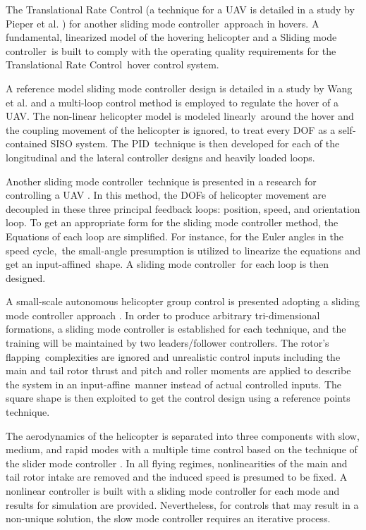 The Translational Rate Control (a technique for a UAV is detailed in a study by Pieper et al. \cite{pieper1995application}) for another sliding mode controller approach in hovers. A fundamental, linearized model of the hovering helicopter and a Sliding mode controller is built to comply with the operating quality requirements for the Translational Rate Control hover control system. 

A reference model sliding mode controller design is detailed in a study by Wang et al. \cite{wang2008model} and a multi-loop control method is employed to regulate the hover of a UAV. The non-linear helicopter model is modeled linearly around the hover and the coupling movement of the helicopter is ignored, to treat every DOF as a self-contained SISO system. The PID technique is then developed for each of the longitudinal and the lateral controller designs and heavily loaded loops. 

Another sliding mode controller technique is presented in a research for controlling a UAV \cite{fu2012chattering}. In this method, the DOFs of helicopter movement are decoupled in these three principal feedback loops: position, speed, and orientation loop. To get an appropriate form for the sliding mode controller method, the Equations of each loop are simplified. For instance, for the Euler angles in the speed cycle, the small-angle presumption is utilized to linearize the equations and get an input-affined shape. A sliding mode controller for each loop is then designed. 

A small-scale autonomous helicopter group control is presented adopting a sliding mode controller approach \cite{fahimi2008full}. In order to produce arbitrary tri-dimensional formations, a sliding mode controller is established for each technique, and the training will be maintained by two leaders/follower controllers. The rotor's flapping complexities are ignored and unrealistic control inputs including the main and tail rotor thrust and pitch and roller moments are applied to describe the system in an input-affine manner instead of actual controlled inputs. The square shape is then exploited to get the control design using a reference points technique. 

The aerodynamics of the helicopter is separated into three components with slow, medium, and rapid modes with a multiple time control based on the technique of the slider mode controller \cite{xu2010multi}. In all flying regimes, nonlinearities of the main and tail rotor intake are removed and the induced speed is presumed to be fixed. A nonlinear controller is built with a sliding mode controller for each mode and results for simulation are provided. Nevertheless, for controls that may result in a non-unique solution, the slow mode controller requires an iterative process. 

